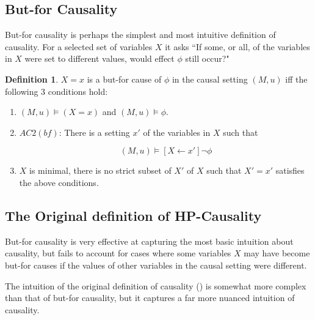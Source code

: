\documentclass{article}
\theoremstyle{plain}
\theoremstyle{definition}
\newtheorem{defn}[thm]{Definition} %
\begin{document}
\subsection{But-for Causality}

But-for causality is perhaps the simplest and most intuitive definition of causality. For a selected set of variables $X$ it asks ``If some, or all, of the variables in $X$ were set to different values, would effect $\phi$ still occur?"

\begin{defn}$X=x$ is a but-for cause of $\phi$ in the causal setting $(M,u)$ iff the following 3 conditions hold:
\begin{enumerate}
\item $(M,u) \models (X=x)$ and $(M,u) \models \phi$.
\item $AC2(bf)$: There is a setting $x'$ of the variables in $X$ such that

\[
(M,u) \models [X\leftarrow x']\lnot \phi
\] 

\item $X$ is minimal, there is no strict subset of $X'$ of $X$ such that $X' = x'$ satisfies the above conditions.
\end{enumerate}

\end{defn}






\subsection{The Original definition of HP-Causality}

But-for causality is very effective at capturing the most basic intuition about causality, but fails to account for cases where some variables $X$ may have become but-for causes if the values of other variables in the causal setting were different.

The intuition of the original definition of causality (\cite{halpern2005causes}) is somewhat more complex than that of but-for causality, but it captures a far more nuanced intuition of causality.
\end{document}
